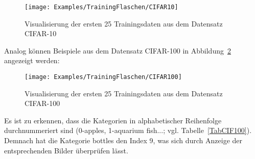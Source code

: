 






\medskip

\begin{figure}[H]
	\begin{center}
		\texttt{[image: Examples/TrainingFlaschen/CIFAR10]}
		\caption{Visualisierung der ersten 25 Trainingsdaten aus dem Datensatz CIFAR-10} 
		\label{CIF10}
	\end{center}
\end{figure}

Analog können Beispiele aus dem Datensatz CIFAR-100 in Abbildung~\ref{CIF100} angezeigt werden:

\medskip









    
\medskip

\begin{figure}[H]
	\begin{center}
		\texttt{[image: Examples/TrainingFlaschen/CIFAR100]}
		\caption{Visualisierung der ersten 25 Trainingsdaten aus dem Datensatz CIFAR-100} 
		\label{CIF100}
	\end{center}
\end{figure}

Es ist zu erkennen, dass die Kategorien in alphabetischer Reihenfolge durchnummeriert sind (0-apples, 1-aquarium fish...; vgl. Tabelle~\ref{TabCIF100}). Demnach hat die Kategorie \glqq bottles\grqq{} den Index 9, was sich durch Anzeige der entsprechenden Bilder überprüfen lässt.

